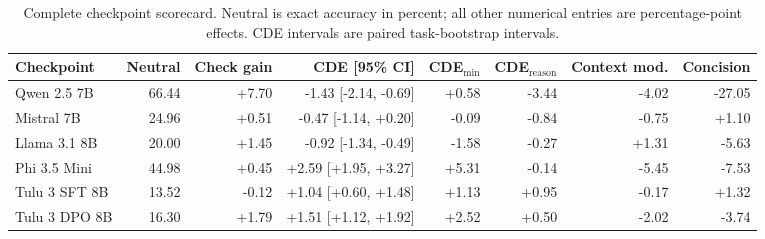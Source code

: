 \begin{table}[t]
\centering\scriptsize
\caption{Complete checkpoint scorecard. Neutral is exact accuracy in percent; all other numerical entries are percentage-point effects. CDE intervals are paired task-bootstrap intervals.}
\label{tab:scorecard}
\begin{tabular}{@{}lrrrrrrr@{}}
\toprule
Checkpoint & Neutral & Check gain & CDE [95\% CI] & CDE$_{\min}$ & CDE$_{\mathrm{reason}}$ & Context mod. & Concision \\
\midrule
Qwen 2.5 7B & 66.44 & +7.70 & -1.43 [-2.14, -0.69] & +0.58 & -3.44 & -4.02 & -27.05 \\
Mistral 7B & 24.96 & +0.51 & -0.47 [-1.14, +0.20] & -0.09 & -0.84 & -0.75 & +1.10 \\
Llama 3.1 8B & 20.00 & +1.45 & -0.92 [-1.34, -0.49] & -1.58 & -0.27 & +1.31 & -5.63 \\
Phi 3.5 Mini & 44.98 & +0.45 & +2.59 [+1.95, +3.27] & +5.31 & -0.14 & -5.45 & -7.53 \\
Tulu 3 SFT 8B & 13.52 & -0.12 & +1.04 [+0.60, +1.48] & +1.13 & +0.95 & -0.17 & +1.32 \\
Tulu 3 DPO 8B & 16.30 & +1.79 & +1.51 [+1.12, +1.92] & +2.52 & +0.50 & -2.02 & -3.74 \\
\bottomrule
\end{tabular}
\end{table}
